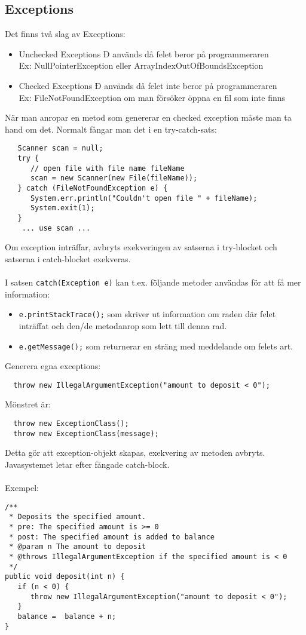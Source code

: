 \documentclass[11pt]{article}
\begin{document}
\subsection{Exceptions}
Det finns två slag av Exceptions:
\begin{itemize}
\item{Unchecked Exceptions Ð används då felet beror på programmeraren \\
Ex: NullPointerException eller ArrayIndexOutOfBoundsException
}
\item{Checked Exceptions Ð används då felet inte beror på programmeraren \\
Ex: FileNotFoundException om man försöker öppna en fil som inte finns
}
\end{itemize}
När man anropar en metod som genererar en checked exception måste man ta hand om det. Normalt fångar man det i en try-catch-sats:
\begin{lstlisting}
   Scanner scan = null;
   try {
      // open file with file name fileName
      scan = new Scanner(new File(fileName));
   } catch (FileNotFoundException e) {
      System.err.println("Couldn't open file " + fileName);
      System.exit(1);
   }
    ... use scan ...
\end{lstlisting}
Om exception inträffar, avbryts exekveringen av satserna i try-blocket och satserna i catch-blocket exekveras.
\\ \\
I satsen \verb+catch(Exception e)+ kan t.ex. följande metoder användas för att få mer information:
\begin{itemize}
\item{ \verb+e.printStackTrace();+ som skriver ut information om raden där felet inträffat och den/de metodanrop som lett till denna rad.}
\item{ \verb+e.getMessage();+ som returnerar en sträng med meddelande om felets art.}
\end{itemize}
Generera egna exceptions:
\begin{lstlisting}
  throw new IllegalArgumentException("amount to deposit < 0");
\end{lstlisting}
Mönstret är: 
\begin{lstlisting}
  throw new ExceptionClass(); 
  throw new ExceptionClass(message); 
\end{lstlisting}
Detta gör att exception-objekt skapas, exekvering av metoden avbryts. Javasystemet letar efter fångade catch-block.
\\ \\
Exempel:
\begin{lstlisting}
/**
 * Deposits the specified amount.
 * pre: The specified amount is >= 0
 * post: The specified amount is added to balance
 * @param n The amount to deposit
 * @throws IllegalArgumentException if the specified amount is < 0
 */
public void deposit(int n) {
   if (n < 0) {
      throw new IllegalArgumentException("amount to deposit < 0");
   }
   balance =  balance + n;
}
\end{lstlisting}
\end{document}
